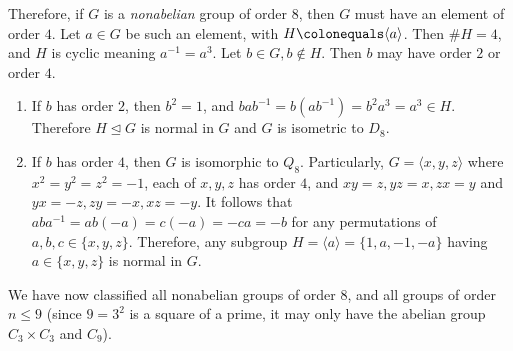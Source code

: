 Therefore, if $G$ is a \emph{nonabelian} group of order $8$, then $G$
must have an element of order $4$.
Let $a \in G$ be such an element, with $H \colonequals \langle a \rangle$.
Then $\#H = 4$, and $H$ is cyclic meaning $a^{-1} = a^3$.
Let $b \in G, b \notin H$. Then $b$ may have order $2$ or order $4$.

\begin{enumerate}
  \item If $b$ has order $2$, then $b^2 = 1$, and
    $bab^{-1} = b(ab^{-1}) = b^2 a^3 = a^3 \in H$.
    Therefore $H \trianglelefteq G$ is normal in $G$ and
    $G$ is isometric to $D_8$.
  \item If $b$ has order $4$, then $G$ is isomorphic to $Q_8$.
    Particularly, $G = \langle x, y, z \rangle$ where $x^2 = y^2 = z^2 = -1$,
    each of $x, y, z$ has order $4$, and $xy = z, yz = x, zx = y$ and
    $yx = -z, zy = -x, xz = -y$.
    It follows that $aba^{-1} = ab(-a) = c(-a) = -ca = -b$ for any
    permutations of $a, b, c \in \{x, y, z \}$.
    Therefore, any subgroup $H = \langle a \rangle = \{1, a, -1, -a \}$
    having $a \in \{ x, y, z \}$ is normal in $G$.
\end{enumerate}

We have now classified all nonabelian groups of order $8$,
and all groups of order $n \leq 9$ (since $9 = 3^2$ is a square of a prime,
it may only have the abelian group $C_3 \times C_3$ and $C_9$).

